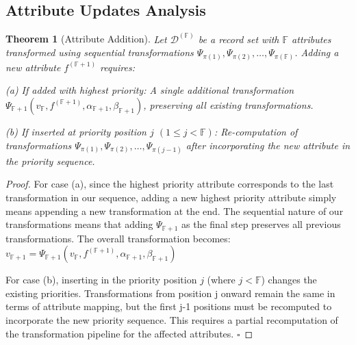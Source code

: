 \documentclass[numbers,sort]{article}
\newtheorem{theorem}{Theorem}
\begin{document}
\subsection{Attribute Updates Analysis}
\label{sec:update_analysis}
\begin{theorem}[Attribute Addition]
Let $\mathcal{D}^{(\mathbb{F})}$ be a record set with $\mathbb{F}$ attributes transformed using sequential transformations $\Psi_{\pi(1)}, \Psi_{\pi(2)}, \ldots, \Psi_{\pi(\mathbb{F})}$. Adding a new attribute $f^{(\mathbb{F}+1)}$ requires:

(a) If added with highest priority: A single additional transformation $\Psi_{\mathbb{F}+1}(v_{\mathbb{F}}, f^{(\mathbb{F}+1)}, \alpha_{\mathbb{F}+1}, \beta_{\mathbb{F}+1})$, preserving all existing transformations.

(b) If inserted at priority position $j$ $(1 \leq j < \mathbb{F})$: Re-computation of transformations $\Psi_{\pi(1)}, \Psi_{\pi(2)}, \ldots, \Psi_{\pi(j-1)}$ after incorporating the new attribute in the priority sequence.
\end{theorem}
\begin{proof}
For case (a), since the highest priority attribute corresponds to the last transformation in our sequence, adding a new highest priority attribute simply means appending a new transformation at the end. The sequential nature of our transformations means that adding $\Psi_{\mathbb{F}+1}$ as the final step preserves all previous transformations. The overall transformation becomes:
$v_{\mathbb{F}+1} = \Psi_{\mathbb{F}+1}(v_{\mathbb{F}}, f^{(\mathbb{F}+1)}, \alpha_{\mathbb{F}+1}, \beta_{\mathbb{F}+1})$

For case (b), inserting in the priority position $j$ (where $j < \mathbb{F}$) changes the existing priorities. Transformations from position j onward remain the same in terms of attribute mapping, but the first j-1 positions must be recomputed to incorporate the new priority sequence. This requires a partial recomputation of the transformation pipeline for the affected attributes. $\square$
\end{proof}
\end{document}

